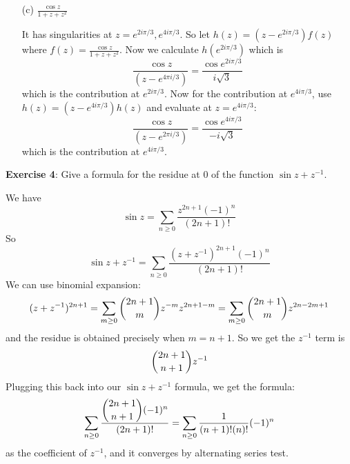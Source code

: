 \documentclass{article}
\begin{document}
\begin{itemize}
        \item [(c)] $\frac{\cos{z}}{1 + z + z^{2}}$ 
            \begin{answer}
                It has singularities at $z = e^{2i\pi/3}, e^{4i\pi/3}$. So let $h(z) = (z - e^{2i\pi/3})f(z)$ where $f(z) = \frac{\cos{z}}{1 + z + z^{2}}$. Now we calculate $h(e^{2i\pi/3})$ which is 
                    \begin{equation*}
                        \dfrac{\cos{z}}{(z - e^{4\pi i / 3})} = \dfrac{\cos{e^{2i\pi/3}}}{i\sqrt{3}}
                    \end{equation*}
                which is the contribution at $e^{2i\pi/3}$. Now for the contribution at $e^{4i\pi/3}$, use $h(z) = (z - e^{4i\pi/3})h(z)$ and evaluate at $z = e^{4i\pi/3}$:
                    \begin{equation*}
                        \dfrac{\cos{z}}{(z - e^{2\pi i / 3})} = \dfrac{\cos{e^{4i\pi/3}}}{-i\sqrt{3}}
                    \end{equation*}
                which is the contribution at $e^{4i\pi/3}$.
            \end{answer}
    \end{itemize}

\textbf{Exercise 4}: Give a formula for the residue at $0$ of the function $\sin{z + z^{-1}}$.
    \begin{answer}
        We have
            \begin{equation*}
                \sin{z} = \sum_{n \geq 0} \dfrac{z^{2n + 1}(-1)^{n}}{(2n + 1)!}
            \end{equation*}
        So 
            \begin{equation*}
                \sin{z + z^{-1}} = \sum_{n \geq 0} \dfrac{(z + z^{-1})^{2n + 1}(-1)^{n}}{(2n + 1)!}
            \end{equation*}
        We can use binomial expansion:
            \begin{equation*}
                (z + z^{-1})^{2n + 1} = \sum_{m \geq 0}\dbinom{2n + 1}{m}z^{-m} z^{2n + 1 - m} = \sum_{m \geq 0}\dbinom{2n + 1}{m}z^{2n - 2m + 1}
            \end{equation*}
        and the residue is obtained precisely when $m = n + 1$. So we get the $z^{-1}$ term is
            \begin{equation*}
                \dbinom{2n + 1}{n + 1}z^{-1}
            \end{equation*}
        Plugging this back into our $\sin{z + z^{-1}}$ formula, we get the formula:
            \begin{equation*}
                \sum_{n \geq 0}\dfrac{\dbinom{2n + 1}{n + 1}(-1)^{n}}{(2n + 1)!} = \sum_{n \geq 0} \dfrac{1}{(n + 1)!(n)!}(-1)^{n}
            \end{equation*}
        as the coefficient of $z^{-1}$, and it converges by alternating series test.
    \end{answer}
\end{document}
